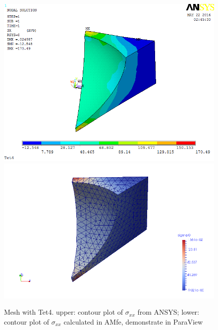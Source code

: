 \begin{figure}[htbp]
	\begin{center}
		\includegraphics[width=13cm,clip]{Tet4Sxx.png} 		
		\includegraphics[width=13cm,clip]{Tet4SxxP.png} 		
		\caption{Mesh with Tet4. upper: contour plot of $\sigma_{xx}$ from ANSYS; lower: contour plot of $\sigma_{xx}$ calculated in AMfe, demonstrate in ParaView} \label{fig: Tet4Sxx}
	\end{center}
\end{figure}
\clearpage 

